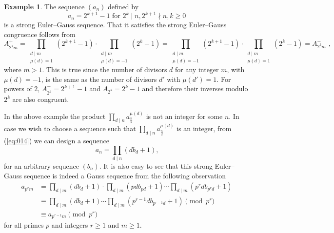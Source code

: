 \documentclass{article}
\numberwithin{equation}{section}
\theoremstyle{definition}
\newtheorem{example}[definition]{\bf {Example}}
\begin{document}
\begin{example}
    The sequence $(a_n)$ defined by 
\[a_n=
    2^{k+1}-1\text{ for } 2^k\mid n, 2^{k+1}\nmid n, k\geq0\]
is a strong Euler--Gauss sequence. That it satisfies the strong Euler--Gauss congruence follows from
\[A_{2^km}^+=\prod_{\substack{d\mid m \\ \mu(d)=1}} (2^{k+1}-1)\cdot\prod_{\substack{d\mid m \\ \mu(d)=-1}} (2^{k}-1)=\prod_{\substack{d\mid m \\ \mu(d)=-1}} (2^{k+1}-1)\cdot\prod_{\substack{d\mid m \\ \mu(d)=1}} (2^{k}-1)=A_{2^km}^-\text{ ,}\]
where $m>1$. This is true since the number of divisors $d$ for any integer $m$, with $\mu(d)=-1$, is the same as the number of divisors $d'$ with $\mu(d')=1$. For powers of $2$, $A_{2^k}^+=2^{k+1}-1$ and $A_{2^k}^-=2^{k}-1$ and therefore their inverses modulo $2^k$ are also congruent.

\end{example}

In the above example the product $\prod_{d\mid n}a_\frac{n}{d}^{\mu(d)}$ is not an integer for some $n$. In case we wish to choose a sequence such that $\prod_{d\mid n}a_\frac{n}{d}^{\mu(d)}$ is an integer, from (\ref{eq:014}) we can design a sequence 
$$
    a_n=\prod_{d\mid n}(db_d+1)\text{,}
$$
for an arbitrary sequence $(b_{n})$. It is also easy to see that this strong Euler--Gauss sequence is indeed a Gauss sequence from the following observation
    \begin{align*}
    a_{p^r m}
    &= \prod_{d\mid m}(db_d+1) \cdot \prod_{d\mid m}(pdb_{pd}+1) \cdots \prod_{d\mid m}(p^r db_{p^r d}+1) \\
    &\equiv \prod_{d\mid m}(db_d+1) \cdots \prod_{d\mid m}(p^{r-1} db_{p^{r-1} d}+1) \pmod{p^r} \\
    &\equiv a_{p^{r-1} m} \pmod{p^r}
\end{align*}
for all primes $p$ and integers $r\geq1$ and $m\geq1$.
\end{document}
